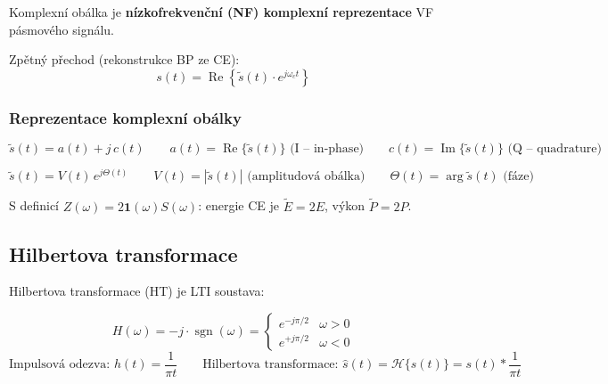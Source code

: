 \documentclass[12pt,a4paper]{article}
\begin{document}
Komplexní obálka je \textbf{nízkofrekvenční (NF) komplexní reprezentace} VF pásmového signálu.

Zpětný přechod (rekonstrukce BP ze CE):
\[
  s(t) = \operatorname{Re}\!\left\{\tilde{s}(t)\cdot e^{j\omega_c t}\right\}
\]

\subsubsection*{Reprezentace komplexní obálky}

\begin{matBox}
\[
  \tilde{s}(t) = a(t) + j\,c(t)
  \qquad
  a(t) = \operatorname{Re}\{\tilde{s}(t)\} \text{ (I – in-phase)}
  \qquad
  c(t) = \operatorname{Im}\{\tilde{s}(t)\} \text{ (Q – quadrature)}
\]
\end{matBox}

\begin{matBox}
\[
  \tilde{s}(t) = V(t)\,e^{j\Theta(t)}
  \qquad
  V(t) = |\tilde{s}(t)| \text{ (amplitudová obálka)}
  \qquad
  \Theta(t) = \arg\tilde{s}(t) \text{ (fáze)}
\]
\end{matBox}

\begin{noteBox}
S definicí $Z(\omega) = 2\mathbf{1}(\omega)S(\omega)$: energie CE je $\tilde{E} = 2E$, výkon $\tilde{P} = 2P$.
\end{noteBox}

\begin{hvezdBox}
\subsection*{Hilbertova transformace}
\end{hvezdBox}

Hilbertova transformace (HT) je LTI soustava:

\begin{matBox}
\[
  H(\omega) = -j\cdot\operatorname{sgn}(\omega)
  = \begin{cases} e^{-j\pi/2} & \omega > 0 \\ e^{+j\pi/2} & \omega < 0 \end{cases}
\]
\[
  \text{Impulsová odezva: } h(t) = \frac{1}{\pi t}
  \qquad
  \text{Hilbertova transformace: } \hat{s}(t) = \mathcal{H}\{s(t)\} = s(t) * \frac{1}{\pi t}
\]
\end{matBox}
\end{document}
